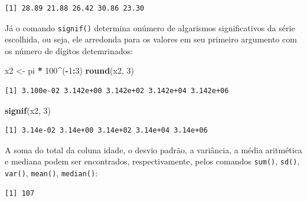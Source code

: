 \documentclass[12pt,brazil,]{book}
\newenvironment{Shaded}{\begin{snugshade}}{\end{snugshade}}
\newcommand{\CommentTok}[1]{\textcolor[rgb]{0.56,0.35,0.01}{\textit{#1}}}
\newcommand{\DecValTok}[1]{\textcolor[rgb]{0.00,0.00,0.81}{#1}}
\newcommand{\KeywordTok}[1]{\textcolor[rgb]{0.13,0.29,0.53}{\textbf{#1}}}
\newcommand{\NormalTok}[1]{#1}
\newcommand{\OperatorTok}[1]{\textcolor[rgb]{0.81,0.36,0.00}{\textbf{#1}}}
\newcommand{\StringTok}[1]{\textcolor[rgb]{0.31,0.60,0.02}{#1}}
\begin{document}
\begin{verbatim}
[1] 28.89 21.88 26.42 30.86 23.30
\end{verbatim}

Já o comando \texttt{signif()} determina onúmero de algarismos
significativos da série escolhida, ou seja, ele arredonda para os
valores em seu primeiro argumento com os número de dígitos detemrinados:

\begin{Shaded}
\begin{Highlighting}[]
\NormalTok{x2 <-}\StringTok{ }\NormalTok{pi }\OperatorTok{*}\StringTok{ }\DecValTok{100}\OperatorTok{^}\NormalTok{(}\OperatorTok{-}\DecValTok{1}\OperatorTok{:}\DecValTok{3}\NormalTok{)}
\KeywordTok{round}\NormalTok{(x2, }\DecValTok{3}\NormalTok{)}
\end{Highlighting}
\end{Shaded}

\begin{verbatim}
[1] 3.100e-02 3.142e+00 3.142e+02 3.142e+04 3.142e+06
\end{verbatim}

\begin{Shaded}
\begin{Highlighting}[]
\KeywordTok{signif}\NormalTok{(x2, }\DecValTok{3}\NormalTok{) }
\end{Highlighting}
\end{Shaded}

\begin{verbatim}
[1] 3.14e-02 3.14e+00 3.14e+02 3.14e+04 3.14e+06
\end{verbatim}

A soma do total da coluna idade, o desvio padrão, a variância, a média
aritmética e mediana podem ser encontrados, respectivamente, pelos
comandos \texttt{sum()}, \texttt{sd()}, \texttt{var()}, \texttt{mean()},
\texttt{median()}:

\begin{Shaded}
\end{Shaded}

\begin{verbatim}
[1] 107
\end{verbatim}

\begin{Shaded}
\end{Shaded}
\end{document}
